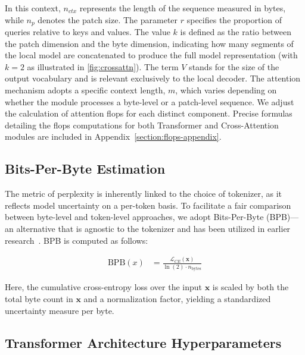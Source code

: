 In this context, $n_{ctx}$ represents the length of the sequence measured in bytes, while $n_p$ denotes the patch size. The parameter $r$ specifies the proportion of queries relative to keys and values. The value $k$ is defined as the ratio between the patch dimension and the byte dimension, indicating how many segments of the local model are concatenated to produce the full model representation (with $k=2$ as illustrated in \autoref{fig:crossattn}). The term $V$ stands for the size of the output vocabulary and is relevant exclusively to the local decoder. The attention mechanism adopts a specific context length, $m$, which varies depending on whether the module processes a byte-level or a patch-level sequence. We adjust the calculation of attention flops for each distinct component. Precise formulas detailing the flops computations for both Transformer and Cross-Attention modules are included in Appendix~\ref{section:flops-appendix}.

\subsection{Bits-Per-Byte Estimation} The metric of perplexity is inherently linked to the choice of tokenizer, as it reflects model uncertainty on a per-token basis. To facilitate a fair comparison between byte-level and token-level approaches, we adopt Bits-Per-Byte (BPB)—an alternative that is agnostic to the tokenizer and has been utilized in earlier research~\citep{xue2022byt5, yu2023megabyte, wang2024mambabyte}. BPB is computed as follows:

\begin{align}
    \text{BPB}(x)&= \frac{\mathcal{L}_{CE}(\pmb{x})}{\ln(2)\cdot n_{\text{bytes}}}
\end{align}

Here, the cumulative cross-entropy loss over the input $\pmb{x}$ is scaled by both the total byte count in $\pmb{x}$ and a normalization factor, yielding a standardized uncertainty measure per byte.

\subsection{Transformer Architecture Hyperparameters} 


